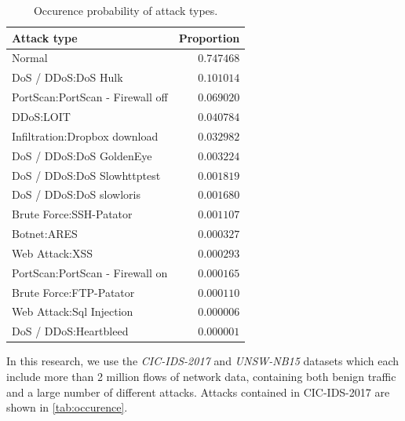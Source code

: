 \documentclass[conference]{IEEEtran}
\begin{document}
\begin{table}[b]
\caption{Occurence probability of attack types.} \label{tab:occurrence}
\centering
\begin{tabular}{l r} \toprule
Attack type & Proportion \\
\midrule
Normal                                                         & $0.747468$ \\
DoS / DDoS:DoS Hulk                                            & $0.101014$ \\
PortScan:PortScan - Firewall off                               & $0.069020$ \\
DDoS:LOIT                                                      & $0.040784$ \\
Infiltration:Dropbox download                                  & $0.032982$ \\
DoS / DDoS:DoS GoldenEye                                       & $0.003224$ \\
DoS / DDoS:DoS Slowhttptest                                    & $0.001819$ \\
DoS / DDoS:DoS slowloris                                       & $0.001680$ \\
Brute Force:SSH-Patator                                        & $0.001107$ \\
Botnet:ARES                                                    & $0.000327$ \\
Web Attack:XSS                                                 & $0.000293$ \\
PortScan:PortScan - Firewall on                                & $0.000165$ \\
Brute Force:FTP-Patator                                        & $0.000110$ \\
Web Attack:Sql Injection                                       & $0.000006$ \\
DoS / DDoS:Heartbleed                                          & $0.000001$ \\
\bottomrule
\end{tabular}
\label{tab:occurence}
\end{table}

In this research, we use the \textit{CIC-IDS-2017} \cite{sharafaldin_toward_2018} and \textit{UNSW-NB15} \cite{moustafa_unsw-nb15:_2015} datasets which each include more than 2 million flows of network data, containing both benign traffic and a large number of different attacks. Attacks contained in CIC-IDS-2017 are shown in \autoref{tab:occurence}.
\end{document}
